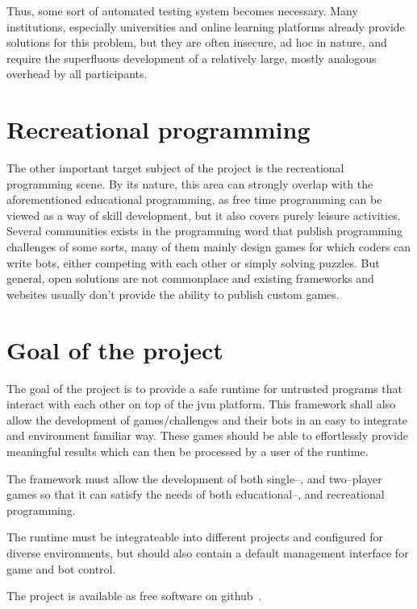 	Thus, some sort of automated testing system becomes necessary. Many institutions, especially universities and online learning platforms already provide solutions for this problem, but they are often insecure, ad hoc in nature, and require the superfluous development of a relatively large, mostly analogous overhead by all participants.
	
	\section{Recreational programming}

	The other important target subject of the project is the recreational programming scene. By its nature, this area can strongly overlap with the aforementioned educational programming, as free time programming can be viewed as a way of skill development, but it also covers purely leisure activities. Several communities exists in the programming word that publish programming challenges of some sorts, many of them mainly design games for which coders can write bots, either competing with each other or simply solving puzzles. But general, open solutions are not commonplace and existing frameworks and websites usually don't provide the ability to publish custom games. 

	\section{Goal of the project}
	
	The goal of the project is to provide a safe runtime for untrusted programs that interact with each other on top of the jvm platform. This framework shall also allow the development of games/challenges and their bots in an easy to integrate and environment familiar way. These games should be able to effortlessly provide meaningful results which can then be processed by a user of the runtime.
	
	The framework must allow the development of both single--, and two--player games so that it can satisfy the needs of both educational--, and recreational programming.
	
	The runtime must be integrateable into different projects and configured for diverse environments, but should also contain a default management interface for game and bot control. 

	The project is available as free software on github~\cite{Tulkas}.

%













